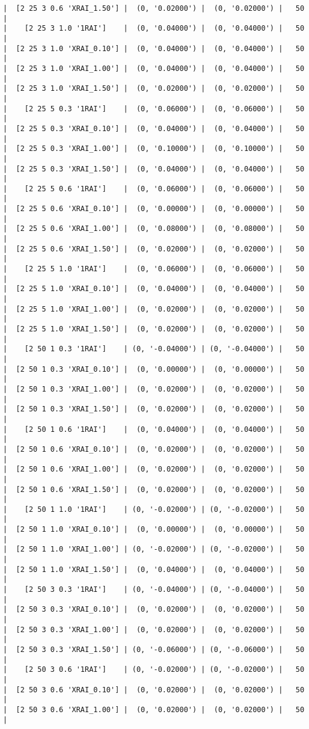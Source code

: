 \documentclass{article}
\begin{document}
\begin{verbatim}
|  [2 25 3 0.6 'XRAI_1.50'] |  (0, '0.02000') |  (0, '0.02000') |   50  |
|    [2 25 3 1.0 '1RAI']    |  (0, '0.04000') |  (0, '0.04000') |   50  |
|  [2 25 3 1.0 'XRAI_0.10'] |  (0, '0.04000') |  (0, '0.04000') |   50  |
|  [2 25 3 1.0 'XRAI_1.00'] |  (0, '0.04000') |  (0, '0.04000') |   50  |
|  [2 25 3 1.0 'XRAI_1.50'] |  (0, '0.02000') |  (0, '0.02000') |   50  |
|    [2 25 5 0.3 '1RAI']    |  (0, '0.06000') |  (0, '0.06000') |   50  |
|  [2 25 5 0.3 'XRAI_0.10'] |  (0, '0.04000') |  (0, '0.04000') |   50  |
|  [2 25 5 0.3 'XRAI_1.00'] |  (0, '0.10000') |  (0, '0.10000') |   50  |
|  [2 25 5 0.3 'XRAI_1.50'] |  (0, '0.04000') |  (0, '0.04000') |   50  |
|    [2 25 5 0.6 '1RAI']    |  (0, '0.06000') |  (0, '0.06000') |   50  |
|  [2 25 5 0.6 'XRAI_0.10'] |  (0, '0.00000') |  (0, '0.00000') |   50  |
|  [2 25 5 0.6 'XRAI_1.00'] |  (0, '0.08000') |  (0, '0.08000') |   50  |
|  [2 25 5 0.6 'XRAI_1.50'] |  (0, '0.02000') |  (0, '0.02000') |   50  |
|    [2 25 5 1.0 '1RAI']    |  (0, '0.06000') |  (0, '0.06000') |   50  |
|  [2 25 5 1.0 'XRAI_0.10'] |  (0, '0.04000') |  (0, '0.04000') |   50  |
|  [2 25 5 1.0 'XRAI_1.00'] |  (0, '0.02000') |  (0, '0.02000') |   50  |
|  [2 25 5 1.0 'XRAI_1.50'] |  (0, '0.02000') |  (0, '0.02000') |   50  |
|    [2 50 1 0.3 '1RAI']    | (0, '-0.04000') | (0, '-0.04000') |   50  |
|  [2 50 1 0.3 'XRAI_0.10'] |  (0, '0.00000') |  (0, '0.00000') |   50  |
|  [2 50 1 0.3 'XRAI_1.00'] |  (0, '0.02000') |  (0, '0.02000') |   50  |
|  [2 50 1 0.3 'XRAI_1.50'] |  (0, '0.02000') |  (0, '0.02000') |   50  |
|    [2 50 1 0.6 '1RAI']    |  (0, '0.04000') |  (0, '0.04000') |   50  |
|  [2 50 1 0.6 'XRAI_0.10'] |  (0, '0.02000') |  (0, '0.02000') |   50  |
|  [2 50 1 0.6 'XRAI_1.00'] |  (0, '0.02000') |  (0, '0.02000') |   50  |
|  [2 50 1 0.6 'XRAI_1.50'] |  (0, '0.02000') |  (0, '0.02000') |   50  |
|    [2 50 1 1.0 '1RAI']    | (0, '-0.02000') | (0, '-0.02000') |   50  |
|  [2 50 1 1.0 'XRAI_0.10'] |  (0, '0.00000') |  (0, '0.00000') |   50  |
|  [2 50 1 1.0 'XRAI_1.00'] | (0, '-0.02000') | (0, '-0.02000') |   50  |
|  [2 50 1 1.0 'XRAI_1.50'] |  (0, '0.04000') |  (0, '0.04000') |   50  |
|    [2 50 3 0.3 '1RAI']    | (0, '-0.04000') | (0, '-0.04000') |   50  |
|  [2 50 3 0.3 'XRAI_0.10'] |  (0, '0.02000') |  (0, '0.02000') |   50  |
|  [2 50 3 0.3 'XRAI_1.00'] |  (0, '0.02000') |  (0, '0.02000') |   50  |
|  [2 50 3 0.3 'XRAI_1.50'] | (0, '-0.06000') | (0, '-0.06000') |   50  |
|    [2 50 3 0.6 '1RAI']    | (0, '-0.02000') | (0, '-0.02000') |   50  |
|  [2 50 3 0.6 'XRAI_0.10'] |  (0, '0.02000') |  (0, '0.02000') |   50  |
|  [2 50 3 0.6 'XRAI_1.00'] |  (0, '0.02000') |  (0, '0.02000') |   50  |

\end{verbatim}
\end{document}
